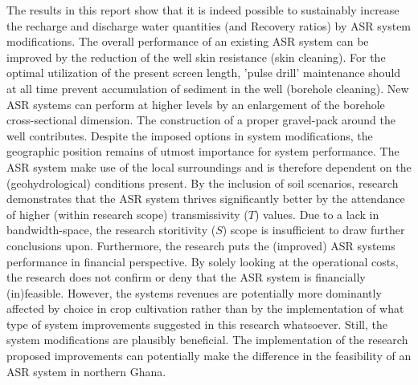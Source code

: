 %

The results in this report show that it is indeed possible to sustainably increase the recharge and discharge water quantities (and Recovery ratios) by ASR system modifications. The overall performance of an existing ASR system can be improved by the reduction of the well skin resistance (skin cleaning). For the optimal utilization of the present screen length, 'pulse drill' maintenance should at all time prevent accumulation of sediment in the well (borehole cleaning). New ASR systems can perform at higher levels by an enlargement of the borehole cross-sectional dimension. The construction of a proper gravel-pack around the well contributes. Despite the imposed options in system modifications, the geographic position remains of utmost importance for system performance. The ASR system make use of the local surroundings and is therefore dependent on the (geohydrological) conditions present. By the inclusion of soil scenarios, research demonstrates that the ASR system thrives significantly better by the attendance of higher (within research scope) transmissivity ($T$) values. Due to a lack in bandwidth-space, the research storitivity ($S$) scope is insufficient to draw further conclusions upon. Furthermore, the research puts the (improved) ASR systems performance in financial perspective. By solely looking at the operational costs, the research does not confirm or deny that the ASR system is financially (in)feasible. However, the systems revenues are potentially more dominantly affected by choice in crop cultivation rather than by the implementation of what type of system improvements suggested in this research whatsoever. Still, the system modifications are plausibly beneficial. The implementation of the research proposed  improvements can potentially make the difference in the feasibility of an ASR system in northern Ghana.  \\


